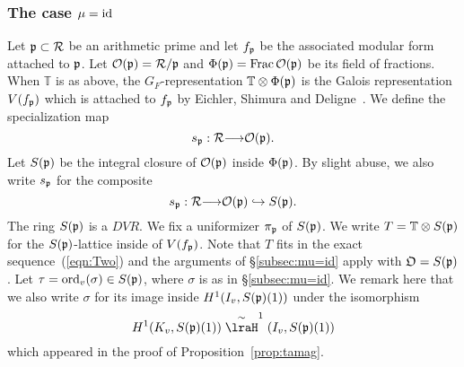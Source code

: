 \documentclass[12pt]{amsart}
\numberwithin{equation}{section}
\begin{document}
 \subsubsection{The case $\mu=\textup{id}$}
 \label{subsec:mu=1}
 Let $\frak{p} \subset {\mathcal{R}}$ be an arithmetic prime and let $f_\frak{p}$ be the associated modular form attached to $\frak{p}$. Let ${\mathcal{O}}(\frak{p})={\mathcal{R}}/\frak{p}$ and $\Phi(\frak{p})=\textup{Frac}\,{\mathcal{O}}(\frak{p})$ be its field of fractions. When ${\mathbb{T}}$ is as above, the $G_F$-representation ${\mathbb{T}}\otimes \Phi(\frak{p})$ is the Galois representation $V(f_\frak{p})$ which is attached to $f_\frak{p}$ by Eichler, Shimura and Deligne~\cite{deligne69}.  We define the specialization map
 $$s_{\frak{p}}:{\mathcal{R}}{\longrightarrow} {\mathcal{O}}(\frak{p}).$$
 Let $S(\frak{p})$ be the integral closure of ${\mathcal{O}}(\frak{p})$ inside $\Phi(\frak{p})$. By slight abuse, we also write $s_\frak{p}$ for the composite
 $$s_\frak{p}: {\mathcal{R}} {\longrightarrow} {\mathcal{O}}(\frak{p}) \hookrightarrow S(\frak{p}).$$
 The ring $S(\frak{p})$ is a $DVR$. We fix a uniformizer $\pi_\frak{p}$ of $S(\frak{p})$.
We write $T={\mathbb{T}}\otimes S(\frak{p})$ for the $S(\frak{p})$-lattice inside of $V(f_\frak{p})$. Note that $T$ fits in the exact sequence~(\ref{eqn:Two}) and the arguments of \S\ref{subsec:mu=id} apply with $\frak{O}=S(\frak{p})$.  Let $\tau={\textup{ord}}_v(\sigma) \in S(\frak{p})$, where $\sigma$ is as in \S\ref{subsec:mu=id}. We remark here that we also write $\sigma$ for its image inside $H^1(I_v,S(\frak{p})(1))$ under the isomorphism
$$H^1(K_v,S(\frak{p})(1))\stackrel{\sim}\lraH^1(I_v,S(\frak{p})(1))$$
 which appeared in the proof of Proposition~\ref{prop:tamag}.
\end{document}

